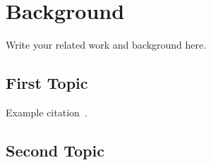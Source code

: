 \chapter{Background}
\label{ch:background}

Write your related work and background here.

\section{First Topic}
\label{sec:first-topic}

Example citation~\cite{example2024}.

\section{Second Topic}
\label{sec:second-topic}

